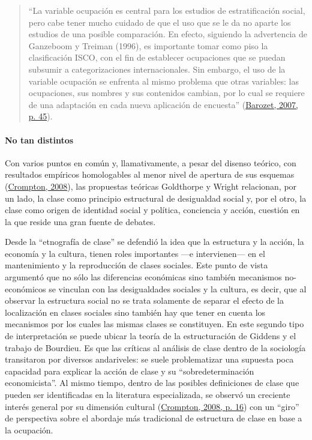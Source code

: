 \documentclass[
]{article}
\begin{document}
\begin{quote}
``La variable ocupación es central para los estudios de estratificación social, pero cabe tener mucho cuidado de que el uso que se le da no aparte los estudios de una posible comparación. En efecto, siguiendo la advertencia de Ganzeboom y Treiman (1996), es importante tomar como piso la clasificación ISCO, con el fin de establecer ocupaciones que se puedan subsumir a categorizaciones internacionales. Sin embargo, el uso de la variable ocupación se enfrenta al mismo problema que otras variables: las ocupaciones, sus nombres y sus contenidos cambian, por lo cual se requiere de una adaptación en cada nueva aplicación de encuesta'' (\protect\hyperlink{ref-Barozet2007}{Barozet, 2007, p. 45}).
\end{quote}

\hypertarget{no-tan-distintos}{%
\paragraph{No tan distintos}\label{no-tan-distintos}}

Con varios puntos en común y, llamativamente, a pesar del disenso teórico, con resultados empíricos homologables al menor nivel de apertura de sus esquemas (\protect\hyperlink{ref-Crompton2008}{Crompton, 2008}), las propuestas teóricas Goldthorpe y Wright relacionan, por un lado, la clase como principio estructural de desigualdad social y, por el otro, la clase como origen de identidad social y política, conciencia y acción, cuestión en la que reside una gran fuente de debates.

Desde la ``etnografía de clase'' se defendió la idea que la estructura y la acción, la economía y la cultura, tienen roles importantes ---e intervienen--- en el mantenimiento y la reproducción de clases sociales. Este punto de vista argumentó que no sólo las diferencias económicas sino también mecanismos no-económicos se vinculan con las desigualdades sociales y la cultura, es decir, que al observar la estructura social no se trata solamente de separar el efecto de la localización en clases sociales sino también hay que tener en cuenta los mecanismos por los cuales las mismas clases se constituyen. En este segundo tipo de interpretación se puede ubicar la teoría de la estructuración de Giddens y el trabajo de Bourdieu. Es que las críticas al análisis de clase dentro de la sociología transitaron por diversos andariveles: se suele problematizar una supuesta poca capacidad para explicar la acción de clase y su ``sobredeterminación economicista''. Al mismo tiempo, dentro de las posibles definiciones de clase que pueden ser identificadas en la literatura especializada, se observó un creciente interés general por su dimensión cultural (\protect\hyperlink{ref-Crompton2008}{Crompton, 2008, p. 16}) con un ``giro'' de perspectiva sobre el abordaje más tradicional de estructura de clase en base a la ocupación.
\end{document}

